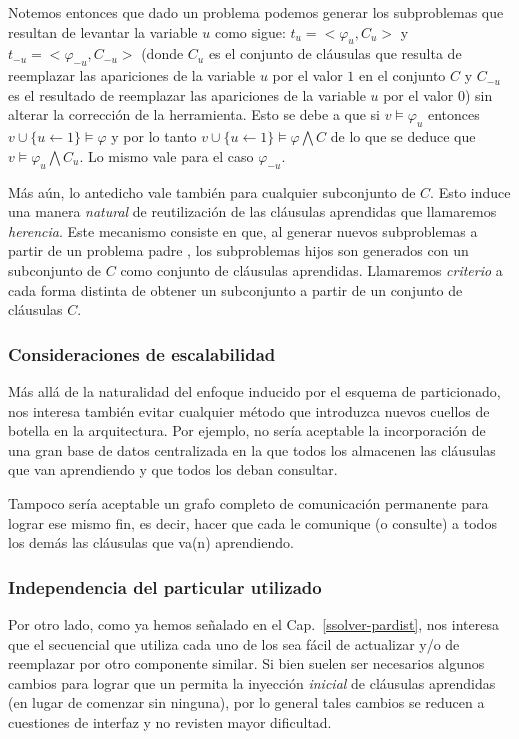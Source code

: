 Notemos entonces que dado un problema \nonemptytask podemos generar los
subproblemas que resultan de levantar la variable $u$ como sigue:
$t_u=<\varphi_u, C_u>$ y $t_{-u}=<\varphi_{-u}, C_{-u}>$ (donde $C_u$ es el
conjunto de cláusulas que resulta de reemplazar las apariciones de la variable
$u$ por el valor $1$ en el conjunto $C$ y $C_{-u}$ es el resultado de
reemplazar las apariciones de la variable $u$ por el valor $0$) sin alterar la
corrección de la herramienta. Esto se debe a que si $v \models \varphi_u$
entonces $v\cup\{u\leftarrow1\} \models \varphi$ y por lo tanto
$v\cup\{u\leftarrow1\} \models \varphi \bigwedge C$ de lo que se deduce que $v
\models \varphi_u \bigwedge C_u$. Lo mismo vale para el caso $\varphi_{-u}$.

Más aún, lo antedicho vale también para cualquier subconjunto de $C$. Esto
induce una manera \emph{natural} de reutilización de las cláusulas aprendidas
que llamaremos \emph{herencia}. Este mecanismo consiste en que, al generar
nuevos subproblemas a partir de un problema padre \nonemptytask, los
subproblemas hijos son generados con un subconjunto de $C$ como conjunto de
cláusulas aprendidas. Llamaremos \emph{criterio} a cada forma distinta de
obtener un subconjunto a partir de un conjunto de cláusulas $C$.


\subsubsection{Consideraciones de escalabilidad}

Más allá de la naturalidad del enfoque inducido por el esquema de
particionado, nos interesa también evitar cualquier método que introduzca
nuevos cuellos de botella en la arquitectura. Por ejemplo, no sería aceptable
la incorporación de una gran base de datos centralizada en la que todos los
\ws almacenen las cláusulas que van aprendiendo y que todos los \ws deban
consultar.

Tampoco sería aceptable un grafo completo de comunicación permanente para
lograr ese mismo fin, es decir, hacer que cada \w le comunique (o consulte) a
todos los demás las cláusulas que va(n) aprendiendo.


\subsubsection{Independencia del \ssolver particular utilizado}

Por otro lado, como ya hemos señalado en el Cap.~\ref{ssolver-pardist}, nos
interesa que el \ssolver secuencial que utiliza cada uno de los \ws sea fácil
de actualizar y/o de reemplazar por otro componente \ots similar. Si bien
suelen ser necesarios algunos cambios para lograr que un \ssolver permita la
inyección \emph{inicial} de cláusulas aprendidas (en lugar de comenzar sin
ninguna), por lo general tales cambios se reducen a cuestiones de interfaz y
no revisten mayor dificultad.

